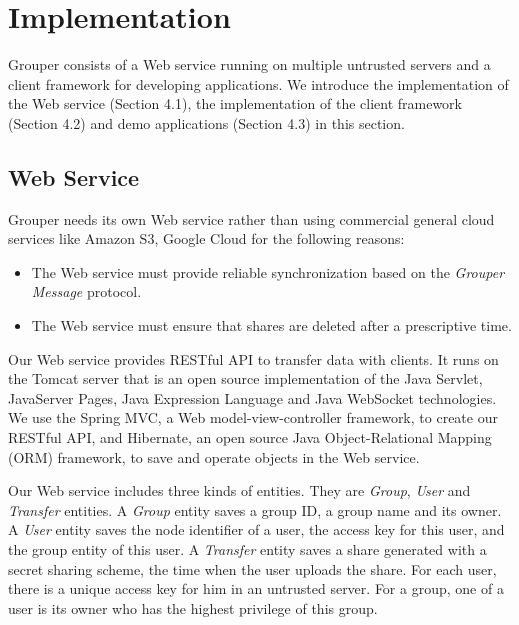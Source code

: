 \documentclass[twocolumn,10pt]{article}
\begin{document}
\section{Implementation}

Grouper consists of a Web service running on multiple untrusted servers and a client framework for developing applications.
We introduce the implementation of the Web service (Section 4.1), the implementation of the client framework (Section 4.2) and demo applications (Section 4.3) in this section.

\subsection{Web Service}

Grouper needs its own Web service rather than using commercial general cloud services like Amazon S3, Google Cloud for the following reasons:

\begin{itemize}
	\setlength{\itemsep}{1pt}
	\setlength{\parskip}{0pt}
	\setlength{\parsep}{0pt}
	\item The Web service must provide reliable synchronization based on the \emph{Grouper Message} protocol.
	\item The Web service must ensure that shares are deleted after a prescriptive time.
\end{itemize}

Our Web service provides RESTful API to transfer data with clients. 
It runs on the Tomcat server that is an open source implementation of the Java Servlet, JavaServer Pages, Java Expression Language and Java WebSocket technologies. 
We use the Spring MVC, a  Web model-view-controller framework, to create our RESTful API, and Hibernate, an open source Java Object-Relational Mapping (ORM) framework, to save and operate objects in the Web service. 

Our Web service includes three kinds of entities. 
They are \emph{Group}, \emph{User} and \emph{Transfer} entities. 
A \emph{Group} entity saves a group ID, a group name and its owner. 
A \emph{User} entity saves the node identifier of a user, the access key for this user, and the group entity of this user. 
A \emph{Transfer} entity saves a share generated with a secret sharing scheme, the time when the user uploads the share. 
For each user, there is a unique access key for him in an untrusted server. For a group, one of a user is its owner who has the highest privilege of this group.
\end{document}
